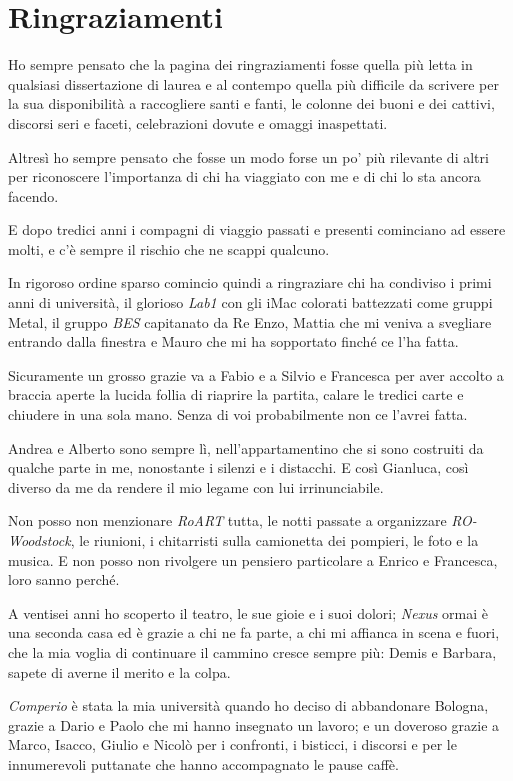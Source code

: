 \chapter*{Ringraziamenti}

Ho sempre pensato che la pagina dei ringraziamenti fosse quella più letta in qualsiasi dissertazione di laurea e al contempo quella più difficile da scrivere per la sua disponibilità a raccogliere santi e fanti, le colonne dei buoni e dei cattivi, discorsi seri e faceti, celebrazioni dovute e omaggi inaspettati.

Altresì ho sempre pensato che fosse un modo forse un po' più rilevante di altri per riconoscere l'importanza di chi ha viaggiato con me e di chi lo sta ancora facendo.

E dopo tredici anni i compagni di viaggio passati e presenti cominciano ad essere molti, e c'è sempre il rischio che ne scappi qualcuno.

In rigoroso ordine sparso comincio quindi a ringraziare chi ha condiviso i primi anni di università, il glorioso \emph{Lab1} con gli iMac colorati battezzati come gruppi Metal, il gruppo \emph{BES} capitanato da Re Enzo, Mattia che mi veniva a svegliare entrando dalla finestra e Mauro che mi ha sopportato finché ce l'ha fatta.

Sicuramente un grosso grazie va a Fabio e a Silvio e Francesca per aver accolto a braccia aperte la lucida follia di riaprire la partita, calare le tredici carte e chiudere in una sola mano. Senza di voi probabilmente non ce l'avrei fatta.

Andrea e Alberto sono sempre lì, nell'appartamentino che si sono costruiti da qualche parte in me, nonostante i silenzi e i distacchi. E così Gianluca, così diverso da me da rendere il mio legame con lui irrinunciabile.

Non posso non menzionare \emph{RoART} tutta, le notti passate a organizzare \emph{RO-Woodstock}, le riunioni, i chitarristi sulla camionetta dei pompieri, le foto e la musica. E non posso non rivolgere un pensiero particolare a Enrico e Francesca, loro sanno perché.

A ventisei anni ho scoperto il teatro, le sue gioie e i suoi dolori; \emph{Nexus} ormai è una seconda casa ed è grazie a chi ne fa parte, a chi mi affianca in scena e fuori, che la mia voglia di continuare il cammino cresce sempre più: Demis e Barbara, sapete di averne il merito e la colpa.

\emph{Comperio} è stata la mia università quando ho deciso di abbandonare Bologna, grazie a Dario e Paolo che mi hanno insegnato un lavoro; e un doveroso grazie a Marco, Isacco, Giulio e Nicolò per i confronti, i bisticci, i discorsi e per le innumerevoli puttanate che hanno accompagnato le pause caffè.

